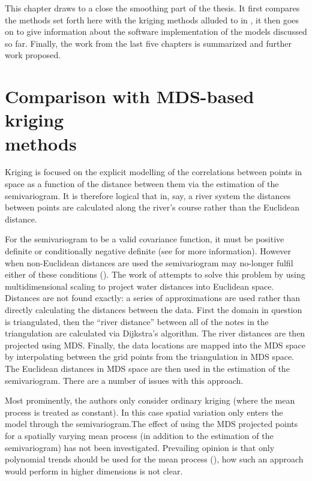 \label{chap-fasend}

This chapter draws to a close the smoothing part of the thesis. It first compares the methods set forth here with the kriging methods alluded to in , it then goes on to give information about the software implementation of the models discussed so far. Finally, the work from the last five chapters is summarized and further work proposed.

\section{Comparison with MDS-based kriging\\methods}
\label{gds-krig}

Kriging is focused on the explicit modelling of the correlations between points in space as a function of the distance between them via the estimation of the semivariogram. It is therefore logical that in, say, a river system the distances between points are calculated along the river's course rather than the Euclidean distance. 

For the semivariogram to be a valid covariance function, it must be positive definite or conditionally negative definite (see \cite[p. 47]{diggle} for more information). However when non-Euclidean distances are used the semivariogram may no-longer fulfil either of these conditions (\cite{curriero}). The work of  attempts to solve this problem by using multidimensional scaling to project water distances into Euclidean space. Distances are not found exactly: a series of approximations are used rather than directly calculating the distances between the data. First the domain in question is triangulated, then the ``river distance'' between all of the notes in the triangulation are calculated via Dijkstra's algorithm. The river distances are then projected using MDS. Finally, the data locations are mapped into the MDS space by interpolating between the grid points from the triangulation in MDS space.  The Euclidean distances in MDS space are then used in the estimation of the semivariogram. There are a number of issues with this approach. 

Most prominently, the authors only consider ordinary kriging (where the mean process is treated as constant). In this case spatial variation only enters the model through the semivariogram.The effect of using the MDS projected points for a spatially varying mean process (in addition to the estimation of the semivariogram) has not been investigated. Prevailing opinion is that only polynomial trends should be used for the mean process (\cite[p. 57]{diggle}), how such an approach would perform in higher dimensions is not clear.


